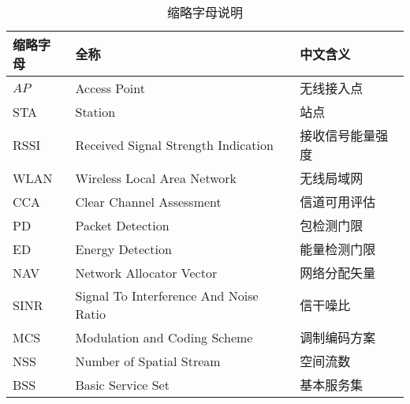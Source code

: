 \begin{table}[H]
	\centering
	\caption{缩略字母说明}
	\begin{tabular}{p{2.0cm}<{\centering}p{8.0cm}<{\centering}p{4.0cm}<{\centering}}
		\hline
		缩略字母 & 全称 & 中文含义  \\ %
		\hline
		$AP$ & Access Point & 无线接入点   \\ %
		STA	& Station	& 站点\\
		
		RSSI &	Received Signal Strength Indication	& 接收信号能量强度\\
		
		WLAN &	Wireless Local Area Network	& 无线局域网\\
		
		CCA &	Clear Channel Assessment	& 信道可用评估\\
		
		PD &	Packet Detection	& 包检测门限\\
		
		ED &	Energy Detection	& 能量检测门限\\
		
		NAV	 & Network Allocator Vector	& 网络分配矢量\\
		
		SINR &	Signal To Interference And Noise Ratio	& 信干噪比\\
		
		MCS &	Modulation and Coding Scheme	& 调制编码方案\\
		
		NSS &	Number of Spatial Stream	& 空间流数\\
		
		BSS &	Basic Service Set	& 基本服务集\\
		
		\hline
	\end{tabular}
\end{table}

